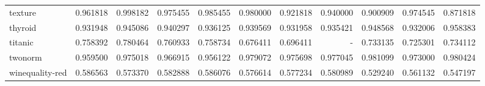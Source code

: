 \begin{tabular}{lrrrrrrrrrr}
texture         &   0.961818 &  0.998182 &  0.975455 &  0.985455 &  0.980000 &  0.921818 &  0.940000 &  0.900909 &  0.974545 &  0.871818 \\
thyroid         &   0.931948 &  0.945086 &  0.940297 &  0.936125 &  0.939569 &  0.931958 &  0.935421 &  0.948568 &  0.932006 &  0.958383 \\
titanic         &   0.758392 &  0.780464 &  0.760933 &  0.758734 &  0.676411 &  0.696411 &      - &  0.733135 &  0.725301 &  0.734112 \\
twonorm         &   0.959500 &  0.975018 &  0.966915 &  0.956122 &  0.979072 &  0.975698 &  0.977045 &  0.981099 &  0.973000 &  0.980424 \\
winequality-red &   0.586563 &  0.573370 &  0.582888 &  0.586076 &  0.576614 &  0.577234 &  0.580989 &  0.529240 &  0.561132 &  0.547197 \\
\bottomrule
\end{tabular}
